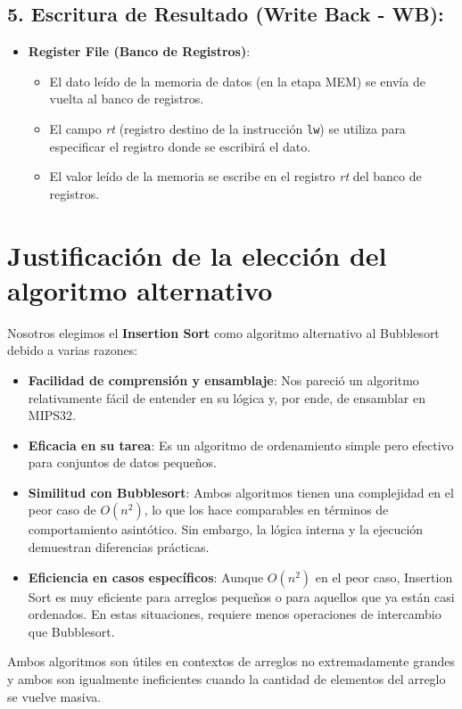 \documentclass{article}
\begin{document}
\subsection*{5. Escritura de Resultado (Write Back - WB):}
\begin{itemize}
    \item \textbf{Register File (Banco de Registros)}:
    \begin{itemize}
        \item El dato leído de la memoria de datos (en la etapa MEM) se envía de vuelta al banco de registros.
        \item El campo \textit{rt} (registro destino de la instrucción \texttt{lw}) se utiliza para especificar el registro donde se escribirá el dato.
        \item El valor leído de la memoria se escribe en el registro \textit{rt} del banco de registros.
    \end{itemize}
\end{itemize}

\section{Justificación de la elección del algoritmo alternativo}
Nosotros elegimos el \textbf{Insertion Sort} como algoritmo alternativo al Bubblesort debido a varias razones:
\begin{itemize}
    \item \textbf{Facilidad de comprensión y ensamblaje}: Nos pareció un algoritmo relativamente fácil de entender en su lógica y, por ende, de ensamblar en MIPS32.
    \item \textbf{Eficacia en su tarea}: Es un algoritmo de ordenamiento simple pero efectivo para conjuntos de datos pequeños.
    \item \textbf{Similitud con Bubblesort}: Ambos algoritmos tienen una complejidad en el peor caso de $O(n^2)$, lo que los hace comparables en términos de comportamiento asintótico. Sin embargo, la lógica interna y la ejecución demuestran diferencias prácticas.
\item \textbf{Eficiencia en casos específicos}: Aunque $O(n^2)$ en el peor caso, Insertion Sort es muy eficiente para arreglos pequeños o para aquellos que ya están casi ordenados. En estas situaciones, requiere menos operaciones de intercambio que Bubblesort.
\end{itemize}
Ambos algoritmos son útiles en contextos de arreglos no extremadamente grandes y ambos son igualmente ineficientes cuando la cantidad de elementos del arreglo se vuelve masiva.
\end{document}
